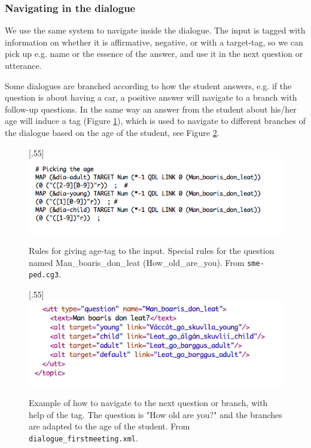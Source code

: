 \documentclass[a4paper,12pt]{article}
\begin{document}
\subsubsection{Navigating in the dialogue}
We use the same system to navigate inside the dialogue. The input is tagged with information on whether it is affirmative, negative, or with a target-tag, so we can pick up e.g. name or the essence of the answer, and use it in the next question or utterance. 

Some dialogues are branched according to how the student answers, e.g. if the question is about having a car, a positive answer will navigate to a branch with follow-up questions. In the same way an answer from the student about his/her age will induce a tag (Figure \ref{age}), which is used to navigate to different branches of the dialogue based on the age of the student, see Figure \ref{branch}.


\begin{figure}[htbp]
\begin{center}
\scalebox{.55}[.55]{\includegraphics{presentation/img/picking_age.png}}\\
\caption{Rules for giving age-tag to the input. Special rules for the question named Man\_boaris\_don\_leat (How\_old\_are\_you). From \texttt{sme-ped.cg3}.}
\label{age}
\end{center}
\end{figure}


\begin{figure}[htbp]
\begin{center}
\scalebox{.55}[.55]{\includegraphics{presentation/img/Man_boaris.png}}\\
\caption{Example of how to navigate to the next question or branch, with help of the tag. The question is "How old are you?" and the branches are adapted to the age of the student. From \texttt{dialogue\_firstmeeting.xml}.}
\label{branch}
\end{center}
\end{figure}
\end{document}

